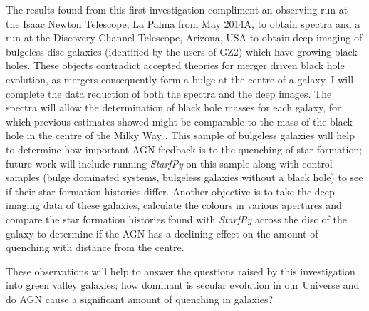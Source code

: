 \documentclass{mn2e}
\begin{document}
The results found from this first investigation compliment an observing run at the Isaac Newton Telescope, La Palma from May 2014A, to obtain spectra and a run at the Discovery Channel Telescope, Arizona, USA to obtain deep imaging of bulgeless disc galaxies (identified by the users of GZ2) which have growing black holes. These objects contradict accepted theories for merger driven black hole evolution, as mergers consequently form a bulge at the centre of a galaxy. I will complete the data reduction of both the spectra and the deep images. The spectra will allow the determination of black hole masses for each galaxy, for which previous estimates showed might be comparable to the mass of the black hole in the centre of the Milky Way \citep{Simmons13}. This sample of bulgeless galaxies will help to determine how important AGN feedback is to the quenching of star formation; future work will include running \emph{StarfPy} on this sample along with control samples (bulge dominated systems, bulgeless galaxies without a black hole) to see if their star formation histories differ. Another objective is to take the deep imaging data of these galaxies, calculate the colours in various apertures and compare the star formation histories found with \emph{StarfPy} across the disc of the galaxy to determine if the AGN has a declining effect on the amount of quenching with distance from the centre. 

These observations will help to answer the questions raised by this investigation into green valley galaxies; how dominant is secular evolution in our Universe and do AGN cause a significant amount of quenching in galaxies?
\end{document}
